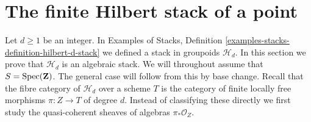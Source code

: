 









\section{The finite Hilbert stack of a point}
\label{section-hilbert-point}

\noindent
Let $d \geq 1$ be an integer. In
Examples of Stacks, Definition \ref{examples-stacks-definition-hilbert-d-stack}
we defined a stack in groupoids $\mathcal{H}_d$.
In this section we prove that $\mathcal{H}_d$ is an
algebraic stack. We will throughout assume that
$S = \mathop{\mathrm{Spec}}(\mathbf{Z})$.
The general case will follow from this by base change.
Recall that the fibre category of $\mathcal{H}_d$ over a scheme $T$
is the category of finite locally free morphisms $\pi : Z \to T$ of
degree $d$. Instead of classifying these directly we first
study the quasi-coherent sheaves of algebras $\pi_*\mathcal{O}_Z$.

